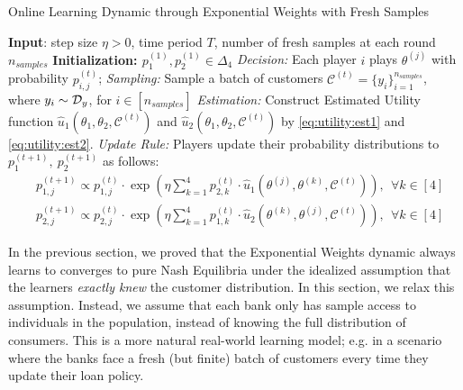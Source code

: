 
\begin{algorithm}[h]
\caption{Online Learning Dynamic through Exponential Weights with Fresh Samples}
\begin{algorithmic}
\label{alg:Hedge:stoc} 
\STATE \textbf{Input}: step size $\eta>0$, time period $T$, number of fresh samples at each round $n_{samples}$
    \STATE \textbf{Initialization: $p_1^{(1)},p_2^{(1)}\in\Delta_4$}
\STATE \emph{Decision:} Each player $i$ plays $\theta^{(j)}$ with probability $p_{i,j}^{(t)}$;
\STATE \emph{Sampling:} Sample a batch of customers $\mathcal{C}^{(t)}=\{y_i\}_{i=1}^{n_{samples}}$, where $y_i\sim\mathcal{D}_y$, for $i\in[n_{samples}]$ 
\STATE \emph{Estimation:} Construct Estimated Utility function $\widehat{u}_1(\theta_1, \theta_2, \mathcal{C}^{(t)})$ and $\widehat{u}_2(\theta_1, \theta_2, \mathcal{C}^{(t)}) $ by \eqref{eq:utility:est1} and \eqref{eq:utility:est2}. 
\STATE \emph{Update Rule:} Players update their probability distributions to $p_{1}^{(t+1)},~p_{2}^{(t+1)}$ as follows:
\begin{align*}
&p^{(t+1)}_{1,j}\propto p^{(t)}_{1,j} \cdot \exp\left(\eta \sum_{k=1}^4 p^{(t)}_{2,k} \cdot \widehat{u}_1\left(\theta^{(j)},\theta^{(k)},\mathcal{C}^{(t)}\right)\right),~~\forall k\in[4]\\
&p^{(t+1)}_{2,j}\propto p^{(t)}_{2,j} \cdot \exp\left(\eta \sum_{k=1}^4 p^{(t)}_{1,k} \cdot \widehat{u}_2\left(\theta^{(k)},\theta^{(j)} ,\mathcal{C}^{(t)}\right)\right),~~\forall k\in[4]
\end{align*}
\ENDFOR
\end{algorithmic}
\end{algorithm}
In the previous section, we proved that the Exponential Weights dynamic always learns to converges to pure Nash Equilibria under the idealized assumption that the learners \emph{exactly knew} the customer distribution. 
In this section, we relax this assumption. 
Instead, we assume that each bank only has sample access to individuals in the population, instead of knowing the full distribution of consumers. 
This is a more natural real-world learning model; e.g. in a scenario where the banks face a fresh (but finite) batch of customers every time they update their loan policy.

